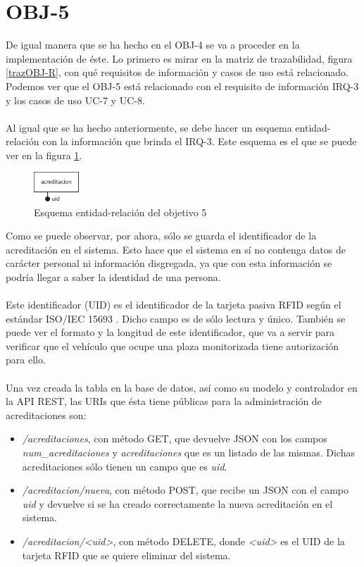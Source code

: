 \section{OBJ-5}
De igual manera que se ha hecho en el OBJ-4 se va a proceder en la implementación de éste. Lo primero es mirar en la matriz de trazabilidad, figura \ref{trazOBJ-R}, con qué requisitos de información y casos de uso está relacionado. Podemos ver que el OBJ-5 está relacionado con el requisito de información IRQ-3 y los casos de uso UC-7 y UC-8.
\\\\
Al igual que se ha hecho anteriormente, se debe hacer un esquema entidad-relación con la información que brinda el IRQ-3. Este esquema es el que se puede ver en la figura \ref{er_objetivo_5}.
\begin{figure}[H]
	\centering
	\includegraphics[width=0.15\textwidth]{imagenes/er_objetivo_5.eps}
	\caption{Esquema entidad-relación del objetivo 5}
	\label{er_objetivo_5}
\end{figure}
Como se puede observar, por ahora, sólo se guarda el identificador de la acreditación en el sistema. Esto hace que el sistema en sí no contenga datos de carácter personal ni información disgregada, ya que con esta información se podría llegar a saber la identidad de una persona.
\\\\
Este identificador (UID) es el identificador de la tarjeta pasiva RFID según el estándar ISO/IEC 15693 \cite{rfid-uid}. Dicho campo es de sólo lectura y único. También se puede ver el formato y la longitud de este identificador, que va a servir para verificar que el vehículo que ocupe una plaza monitorizada tiene autorización para ello.
\\\\
Una vez creada la tabla en la base de datos, así como su modelo y controlador en la API REST, las URIs que ésta tiene públicas para la administración de acreditaciones son:
\begin{itemize}
	\item \textit{/acreditaciones}, con método GET, que devuelve JSON con los campos \textit{num\_acreditaciones} y \textit{acreditaciones} que es un listado de las mismas. Dichas acreditaciones sólo tienen un campo que es \textit{uid}.
	\item \textit{/acreditacion/nueva}, con método POST, que recibe un JSON con el campo \textit{uid} y devuelve si se ha creado correctamente la nueva acreditación en el sistema.
	\item \textit{/acreditacion/<uid>}, con método DELETE, donde \textit{<uid>} es el UID de la tarjeta RFID que se quiere eliminar del sistema.
\end{itemize}
